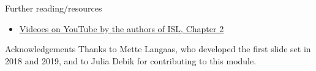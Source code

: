 \documentclass[
  ignorenonframetext,
]{beamer}
\providecommand{\tightlist}{%
  \setlength{\itemsep}{0pt}\setlength{\parskip}{0pt}}
\begin{document}
\begin{frame}{ Further reading/resources}
\protect\hypertarget{further-readingresources}{}
\begin{itemize}
\tightlist
\item
  \href{https://www.youtube.com/playlist?list=PL5-da3qGB5IDvuFPNoSqheihPOQNJpzyy}{Videoes
  on YouTube by the authors of ISL, Chapter 2}
\end{itemize}
\end{frame}

\begin{frame}{Acknowledgements}
\protect\hypertarget{acknowledgements}{}
Thanks to Mette Langaas, who developed the first slide set in 2018 and
2019, and to Julia Debik for contributing to this module.
\end{frame}
\end{document}
